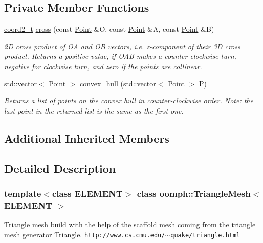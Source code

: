 \subsection*{Private Member Functions}
\begin{DoxyCompactItemize}
\item 
\hyperlink{classoomph_1_1TriangleMesh_afd4948d805e89116cc5da629e413a449}{coord2\+\_\+t} \hyperlink{classoomph_1_1TriangleMesh_a83f8fd5592a7ba062eec9390b7b84426}{cross} (const \hyperlink{structoomph_1_1TriangleMesh_1_1Point}{Point} \&O, const \hyperlink{structoomph_1_1TriangleMesh_1_1Point}{Point} \&A, const \hyperlink{structoomph_1_1TriangleMesh_1_1Point}{Point} \&B)
\begin{DoxyCompactList}\small\item\em 2D cross product of OA and OB vectors, i.\+e. z-\/component of their 3D cross product. Returns a positive value, if O\+AB makes a counter-\/clockwise turn, negative for clockwise turn, and zero if the points are collinear. \end{DoxyCompactList}\item 
std\+::vector$<$ \hyperlink{structoomph_1_1TriangleMesh_1_1Point}{Point} $>$ \hyperlink{classoomph_1_1TriangleMesh_a97228c6d359e1e58efb45dcba1386969}{convex\+\_\+hull} (std\+::vector$<$ \hyperlink{structoomph_1_1TriangleMesh_1_1Point}{Point} $>$ P)
\begin{DoxyCompactList}\small\item\em Returns a list of points on the convex hull in counter-\/clockwise order. Note\+: the last point in the returned list is the same as the first one. \end{DoxyCompactList}\end{DoxyCompactItemize}
\subsection*{Additional Inherited Members}


\subsection{Detailed Description}
\subsubsection*{template$<$class E\+L\+E\+M\+E\+NT$>$\newline
class oomph\+::\+Triangle\+Mesh$<$ E\+L\+E\+M\+E\+N\+T $>$}

Triangle mesh build with the help of the scaffold mesh coming from the triangle mesh generator Triangle. \href{http://www.cs.cmu.edu/~quake/triangle.html}{\tt http\+://www.\+cs.\+cmu.\+edu/$\sim$quake/triangle.\+html} 

